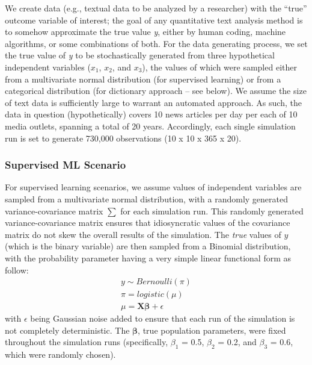 \documentclass[man, floatsintext, 12pt, a4paper, noextraspace]{apa6}
\begin{document}
    We create data (e.g., textual data to be analyzed by a researcher) with the \enquote{true} outcome variable of interest; the goal of any quantitative text analysis method is to somehow approximate the true value \textit{y}, either by human coding, machine algorithms, or some combinations of both. For the data generating process, we set the true value of \textit{y} to be stochastically generated from three hypothetical independent variables ($x_1$, $x_2$, and $x_3$), the values of which were sampled either from a multivariate normal distribution (for supervised learning) or from a categorical distribution (for dictionary approach -- see below). We assume the size of text data is sufficiently large to warrant an automated approach. As such, the data in question (hypothetically) covers 10 news articles per day per each of 10 media outlets, spanning a total of 20 years. Accordingly, each single simulation run is set to generate 730,000 observations (10 x 10 x 365 x 20).
    
    \subsubsection{Supervised ML Scenario}
    For supervised learning scenarios, we assume values of independent variables are sampled from a multivariate normal distribution, with a randomly generated variance-covariance matrix \textbf{$\sum$} for each simulation run. This randomly generated variance-covariance matrix ensures that idiosyncratic values of the covariance matrix do not skew the overall results of the simulation. The \textit{true}  values of $y$ (which is the binary variable) are then sampled from a Binomial distribution, with the probability parameter having a very simple linear functional form as follow:
    \setlength{\abovedisplayskip}{2pt}
    \setlength{\belowdisplayskip}{6pt}
    \begin{equation}
        \begin{gathered}
            y \sim Bernoulli(\pi) \\
            \pi = logistic(\mu) \\
            \mu = \boldsymbol{X\beta} + \epsilon
        \end{gathered}
    \end{equation}
    \noindent with $\epsilon$ being Gaussian noise added to ensure that each run of the simulation is not completely deterministic. The $\boldsymbol{\beta}$, true population parameters, were fixed throughout the simulation runs (specifically, $\beta_1$ = 0.5, $\beta_2$ = 0.2, and $\beta_3$ = 0.6, which were randomly chosen). 
    
\end{document}
